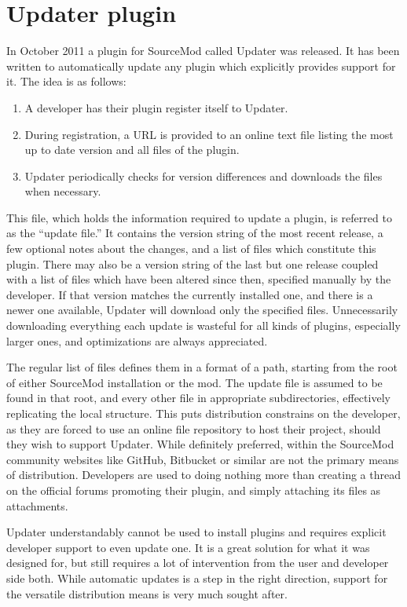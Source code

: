 \section{Updater plugin}
\label{updater-plugin}

In October 2011 a plugin for SourceMod called Updater was released.
It has been written to automatically update any plugin which explicitly provides support for it.
The idea is as follows:

\begin{enumerate}
    \item A developer has their plugin register itself to Updater.
    \item During registration, a URL is provided to an online text file listing the most up to date version and all files of the plugin.
    \item Updater periodically checks for version differences and downloads the files when necessary.
\end{enumerate}

This file, which holds the information required to update a plugin, is referred to as the ``update file.''
It contains the version string of the most recent release, a few optional notes about the changes, and a list of files which constitute this plugin.
There may also be a version string of the last but one release coupled with a list of files which have been altered since then, specified manually by the developer.
If that version matches the currently installed one, and there is a newer one available, Updater will download only the specified files.
Unnecessarily downloading everything each update is wasteful for all kinds of plugins, especially larger ones, and optimizations are always appreciated.

The regular list of files defines them in a format of a path, starting from the root of either SourceMod installation or the mod.
The update file is assumed to be found in that root, and every other file in appropriate subdirectories, effectively replicating the local structure.
This puts distribution constrains on the developer, as they are forced to use an online file repository to host their project, should they wish to support Updater.
While definitely preferred, within the SourceMod community websites like GitHub, Bitbucket or similar are not the primary means of distribution.
Developers are used to doing nothing more than creating a thread on the official forums promoting their plugin, and simply attaching its files as attachments.

Updater understandably cannot be used to install plugins and requires explicit developer support to even update one.
It is a great solution for what it was designed for, but still requires a lot of intervention from the user and developer side both.
While automatic updates is a step in the right direction, support for the versatile distribution means is very much sought after.
